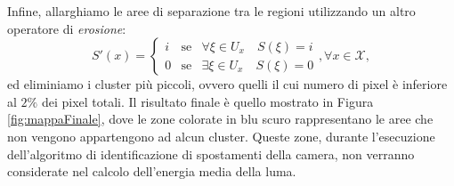 Infine, allarghiamo le aree di separazione tra le regioni utilizzando un altro operatore di \textit{erosione}:
\[ S'(x) =  \left\{ \begin{array}{rcl}
i & \mbox{se} & \forall \xi \in U_x \quad S(\xi) = i \\
0 & \mbox{se} & \exists \xi \in U_x \quad S(\xi) = 0
\end{array}\right. , \forall x \in \mathcal{X},\]
ed eliminiamo i cluster pi\`u piccoli, ovvero quelli il cui numero di pixel \`e inferiore al $2\%$ dei pixel totali.   
Il risultato finale \`e quello mostrato in Figura \ref{fig:mappaFinale}, dove le zone colorate in blu scuro rappresentano le aree che non vengono appartengono ad alcun cluster.
Queste zone, durante l'esecuzione dell'algoritmo di identificazione di spostamenti della camera, non verranno considerate nel calcolo dell'energia media della luma.
